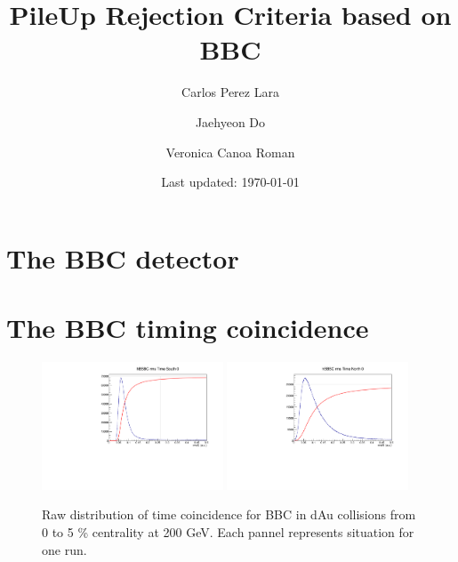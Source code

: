 \documentclass{article}
\title{PileUp Rejection Criteria based on BBC}
\author{Carlos Perez Lara\and Jaehyeon Do \and Veronica Canoa Roman}
\date{Last updated: \today}
\begin{document}
\maketitle

\section{The BBC detector}
\section{The BBC timing coincidence}
\begin{figure}
\includegraphics[width=0.48\textwidth]{fig_pileup/dAu200MB_rmsSouth_455547}
\includegraphics[width=0.48\textwidth]{fig_pileup/dAu200MB_rmsNorth_455547}
\label{fig.dau200mb.bbctimetime}
\caption{Raw distribution of time coincidence for BBC in dAu collisions from 0 to 5 \% centrality at 200 GeV. Each pannel represents situation for one run.}
\end{figure}
\end{document}

